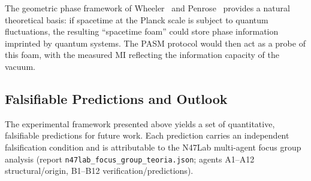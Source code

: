 ﻿\documentclass[12pt,a4paper]{article}
\begin{document}
The geometric phase framework of Wheeler~\cite{wheeler1957} and Penrose~\cite{penrose1996} provides a natural theoretical basis: if spacetime at the Planck scale is subject to quantum fluctuations, the resulting ``spacetime foam'' could store phase information imprinted by quantum systems. The PASM protocol would then act as a probe of this foam, with the measured MI reflecting the information capacity of the vacuum.

\subsection{Falsifiable Predictions and Outlook}

The experimental framework presented above yields a set of quantitative, falsifiable predictions for future work. Each prediction carries an independent falsification condition and is attributable to the N47Lab multi-agent focus group analysis (report \texttt{n47lab\_focus\_group\_teoria.json}; agents A1--A12 structural/origin, B1--B12 verification/predictions).
\end{document}
